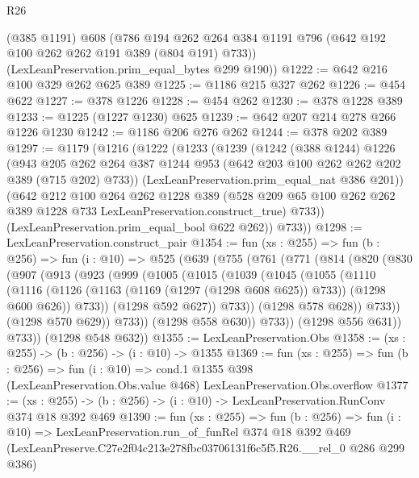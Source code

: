 \begin{lexlean}{R26}
\begin{coremodule}
      (@385 @1191)
      @608
      (@786 @194 @262 @264 @384 @1191 @796 (@642 @192 @100 @262 @262 @191 @389 (@804 @191) @733))
      (LexLeanPreservation.prim_equal_bytes @299 @190))
@1222 := @642 @216 @100 @329 @262 @625 @389
@1225 := @1186 @215 @327 @262
@1226 := @454 @622
@1227 := @378 @1226
@1228 := @454 @262
@1230 := @378 @1228 @389
@1233 := @1225 (@1227 @1230) @625
@1239 := @642 @207 @214 @278 @266 @1226 @1230
@1242 := @1186 @206 @276 @262
@1244 := @378 @202 @389
@1297 := @1179
    (@1216
      (@1222
        (@1233
          (@1239
            (@1242
              (@388 @1244)
              @1226
              (@943
                @205
                @262
                @264
                @387
                @1244
                @953
                (@642 @203 @100 @262 @262 @202 @389 (@715 @202) @733))
              (LexLeanPreservation.prim_equal_nat @386 @201))
            (@642
              @212
              @100
              @264
              @262
              @1228
              @389
              (@528 @209 @65 @100 @262 @262 @389 @1228 @733 LexLeanPreservation.construct_true)
              @733))
          (LexLeanPreservation.prim_equal_bool @622 @262))
        @733))
@1298 := LexLeanPreservation.construct_pair
@1354 := fun (xs : @255) =>
  fun (b : @256) =>
  fun (i : @10) =>
  @525
    (@639
      (@755
        (@761
          (@771
            (@814
              (@820
                (@830
                  (@907
                    (@913
                      (@923
                        (@999
                          (@1005
                            (@1015
                              (@1039
                                (@1045
                                  (@1055
                                    (@1110
                                      (@1116
                                        (@1126
                                          (@1163 (@1169 (@1297 (@1298 @608 @625)) @733))
                                          (@1298 @600 @626))
                                        @733))
                                    (@1298 @592 @627))
                                  @733))
                              (@1298 @578 @628))
                            @733))
                        (@1298 @570 @629))
                      @733))
                  (@1298 @558 @630))
                @733))
            (@1298 @556 @631))
          @733))
      (@1298 @548 @632))
@1355 := LexLeanPreservation.Obs
@1358 := (xs : @255) -> (b : @256) -> (i : @10) -> @1355
@1369 := fun (xs : @255) =>
  fun (b : @256) =>
  fun (i : @10) =>
  cond.{1} @1355 @398 (LexLeanPreservation.Obs.value @468) LexLeanPreservation.Obs.overflow
@1377 := (xs : @255) -> (b : @256) -> (i : @10) -> LexLeanPreservation.RunConv @374 @18 @392 @469
@1390 := fun (xs : @255) =>
  fun (b : @256) =>
  fun (i : @10) =>
  LexLeanPreservation.run_of_funRel
    @374
    @18
    @392
    @469
    (LexLeanPreserve.C27e2f04c213e278fbc03706131f6c5f5.R26.__rel_0 @286 @299 @386)
\end{coremodule}
\end{lexlean}
